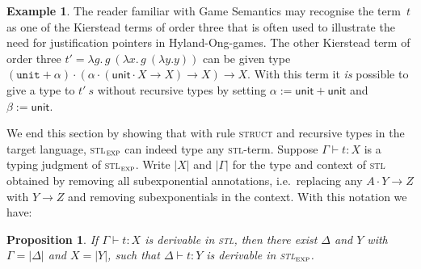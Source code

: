 \documentclass{LMCS}
\theoremstyle{definition}
\newtheorem{example}[thm]{Example}
\theoremstyle{plain}
\newtheorem{proposition}[thm]{Proposition}
\newcommand{\lollipop}{\to}
\newcommand{\lolli}[3]{#1\cdot #2 \to #3}
\newcommand{\kw}[1]{\mathsf{#1}}
\newcommand{\unit}{\mathtt{unit}}
\newcommand{\R}[1]{\textsc{#1}}
\newcommand{\SeqTm}[3]{#1 \vdash #2 \colon #3}
\newcommand{\stlexp}{\textsc{stl}$_\textsc{exp}$\xspace}
\begin{document}
\begin{example}
The reader familiar with Game Semantics may recognise the term~$t$ as 
one of the Kierstead terms of order three that is often used to 
illustrate the need for
justification pointers in Hyland-Ong-games. The other Kierstead term
of order three 
$t' = \lambda g.\, g\ (\lambda x.\, g\ (\lambda y.y))$ can be given type
$(\unit +\alpha)\cdot (\alpha\cdot(\kw{unit}\cdot X \lollipop X) \lollipop X)
\lollipop X$. With this term it \emph{is} possible to give a type to $t'\ s$ 
without recursive types by setting
$\alpha := \kw{unit} + \kw{unit}$ and $\beta := \kw{unit}$.
\end{example}

We end this section by showing that with rule \R{struct} and recursive
types in the target language, \stlexp can indeed type any
\textsc{stl}-term.
Suppose $\SeqTm{\Gamma}{t}{X}$ is a typing judgment of
\stlexp.
Write $|X|$ and $|\Gamma|$ for the type and
context of \textsc{stl} obtained by removing all subexponential 
annotations, i.e.~replacing any $\lolli A Y Z$ with $Y\to Z$ and 
removing subexponentials in the context.
With this notation we have:
\begin{proposition}
  \label{prop:stl}
  If\/ $\SeqTm{\Gamma}{t}{X}$ is derivable in \textsc{stl},
  then there exist $\Delta$ and $Y$ with
  $\Gamma = |\Delta|$ and $X=|Y|$, such that
  $\SeqTm{\Delta}{t}{Y}$ is derivable in \stlexp.
\end{proposition}
\end{document}
